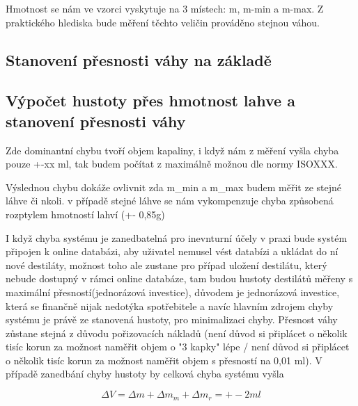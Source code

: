 Hmotnost se nám ve vzorci vyskytuje na 3 místech: m, m-min a m-max. Z praktického hlediska bude měření těchto veličin prováděno stejnou váhou.

\subsection{Stanovení přesnosti váhy na základě }
\subsection{Výpočet hustoty přes hmotnost lahve a stanovení přesnosti váhy}

Zde dominantní chybu tvoří objem kapaliny, i když nám z měření vyšla chyba pouze +-xx ml, tak budem počítat z maximálně možnou dle normy ISOXXX.

Výslednou chybu dokáže ovlivnit zda m\_min a m\_max budem měřit ze stejné láhve či nkoli. v případě stejné láhve se nám vykompenzuje chyba způsobená rozptylem hmotností lahví (+- 0,85g)

I když chyba systému je zanedbatelná pro inevnturní účely v praxi bude systém připojen k online databázi, aby uživatel nemusel vést databízi a ukládat do ní nové destiláty, možnost toho ale zustane pro případ uložení destilátu, který nebude dostupný v rámci online databáze, tam budou hustoty destilátů měřeny s maximální přesností(jednorázová investice), důvodem je jednorázová investice, která se finančně nijak nedotýka spotřebitele a navíc hlavním zdrojem chyby systému je právě ze stanovená hustoty, pro minimalizaci chyby. Přesnost váhy zůstane stejná z důvodu pořizovacích nákladů (není důvod si připlácet o několik tisíc korun za možnost naměřit objem o "3 kapky" lépe / není důvod si připlácet o několik tisíc korun za možnost naměřit objem s přesností na 0,01 ml). V případě zanedbání chyby hustoty by celková chyba systému vyšla 


\[\Delta V = \Delta m + \Delta m_m + \Delta m_r = +- 2 ml\]


